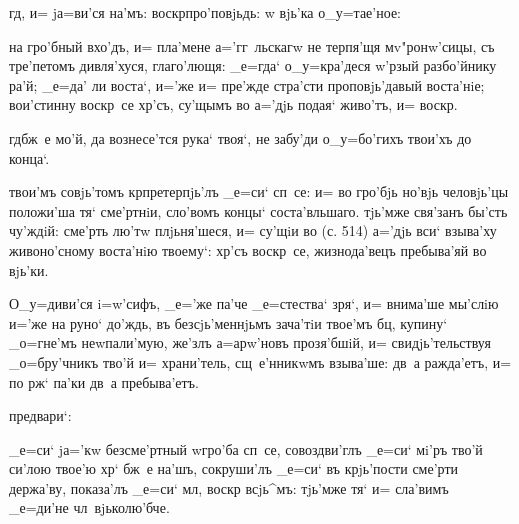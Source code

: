 
 гд, и= jа=ви'ся на'мъ:       воскр про'повjьдь: 
      w\т 
вjь'ка о_у=тае'ное: 


 на гро'бный вхо'дъ, и= пла'мене 
а='гг~льскагw не терпя'щя мv"ронw'сицы, съ тре'петомъ 
дивля'хуся, глаго'лющя: _е=гда` о_у=кра'деся w'рзый 
разбо'йнику ра'й; _е=да' ли воста`, и='же и= пре'жде 
стра'сти проповjь'давый воста'нiе; вои'стинну воскр~се 
хр'съ, су'щымъ во а='дjь подая` живо'тъ, и= 
воскр.

  гд бж~е мо'й, да вознесе'тся 
рука` твоя`, не забу'ди о_у=бо'гихъ твои'хъ до конца`.

 твои'мъ совjь'томъ кр претерпjь'лъ 
_е=си` сп~се: и= во гро'бjь но'вjь человjь'цы положи'ша 
тя` сме'ртнiи, сло'вомъ концы` соста'вльшаго. тjь'мже 
свя'занъ бы'сть чу'ждiй: сме'рть лю'тw плjьня'шеся, и= 
су'щiи во (с. 514) а='дjь вси` взыва'ху живоно'сному 
воста'нiю твоему`: хр'съ воскр~се, жизнода'вецъ 
пребыва'яй во вjь'ки.

 О_у=диви'ся 
i=w'сифъ, _е='же па'че _е=стества` зря`, и= внима'ше 
мы'слiю и='же на руно` до'ждь, въ безсjь'меннjьмъ 
зача'тiи твое'мъ бц, купину` _о=гне'мъ неwпали'мую, 
же'злъ а=арw'новъ прозя'бшiй, и= свидjь'тельствуя 
_о=бру'чникъ тво'й и= храни'тель, сщ~е'нникwмъ взыва'ше: 
дв~а ражда'етъ, и= по рж` па'ки дв~а пребыва'етъ.


  предвари`:

 _е=си` jа='кw безсме'ртный w\т гро'ба 
сп~се, совоздви'глъ _е=си` мi'ръ тво'й си'лою твое'ю 
хр` бж~е на'шъ, сокруши'лъ _е=си` въ крjь'пости 
сме'рти держа'ву, показа'лъ _е=си` мл, воскр 
всjь^мъ: тjь'мже тя` и= сла'вимъ _е=ди'не чл~вjьколю'бче.


